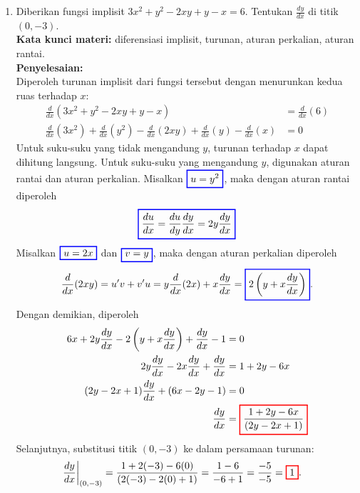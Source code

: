 \documentclass[10pt,openany,a4paper]{article}
\theoremstyle{definition}
\theoremstyle{definition}
\theoremstyle{plain}
\newenvironment{jawab}[2][tes]{
\textbf{Kata kunci materi:} #1.\\
\textbf{Penyelesaian:} #2
}{}
\begin{document}
\begin{enumerate}
    \item Diberikan fungsi implisit \(3x^2 + y^2 - 2xy + y - x = 6\). Tentukan \(\frac{dy}{dx}\) di titik \((0,-3)\).\\
    \begin{jawab}[diferensiasi implisit, turunan, aturan perkalian, aturan rantai]{~\\
        Diperoleh turunan implisit dari fungsi tersebut dengan menurunkan kedua ruas terhadap \(x\):
        \begin{align*}
            \frac{d}{dx}(3x^2 + y^2 - 2xy + y - x) &= \frac{d}{dx}(6)\\
            \frac{d}{dx}(3x^2) + \frac{d}{dx}(y^2) - \frac{d}{dx}(2xy) + \frac{d}{dx}(y) - \frac{d}{dx}(x) &= 0
        \end{align*}
        Untuk suku-suku yang tidak mengandung \(y\), turunan terhadap \(x\) dapat dihitung langsung. Untuk suku-suku yang mengandung \(y\), digunakan aturan rantai dan aturan perkalian. Misalkan $\colorlet{oldcolor}{.}
        \color{blue}
        \setlength{\fboxrule}{1pt} \boxed{\color{oldcolor}u=y^2}\color{oldcolor}$, maka dengan aturan rantai diperoleh
        \begin{align*}
            \colorlet{oldcolor}{.}
        \color{blue}
        \setlength{\fboxrule}{1pt} \boxed{\color{oldcolor}\frac{du}{dx} = \frac{du}{dy}\frac{dy}{dx} = 2y\frac{dy}{dx}}\color{oldcolor}
        \end{align*}
        Misalkan $\colorlet{oldcolor}{.}
        \color{blue}
        \setlength{\fboxrule}{1pt} \boxed{\color{oldcolor}u=2x}\color{oldcolor}$ dan $\colorlet{oldcolor}{.}
        \color{blue}
        \setlength{\fboxrule}{1pt}\boxed{\color{oldcolor}v=y}\color{oldcolor}$, maka dengan aturan perkalian diperoleh
        \begin{align*}
        \frac{d}{dx}(2xy)=u'v+v'u=y\frac{d}{dx}(2x) + x\frac{dy}{dx}= \colorlet{oldcolor}{.}
        \color{blue}
        \setlength{\fboxrule}{1pt} \boxed{\color{oldcolor}2\left(y + x\frac{dy}{dx}\right)}\color{oldcolor}.
        \end{align*}
        Dengan demikian, diperoleh
        \begin{align*}
            6x + 2y\frac{dy}{dx} - 2\left(y + x\frac{dy}{dx}\right) + \frac{dy}{dx} - 1 &= 0\\
            2y\frac{dy}{dx}  - 2x\frac{dy}{dx} + \frac{dy}{dx}  &= 1+2y-6x\\
            (2y - 2x + 1)\frac{dy}{dx} + (6x - 2y - 1) &= 0\\
            \frac{dy}{dx} &=
            \colorlet{oldcolor}{.}
        \color{red}
        \setlength{\fboxrule}{1pt} \boxed{\color{oldcolor}\frac{1+2y-6x}{(2y - 2x + 1)}}\color{oldcolor}
        \end{align*}
        Selanjutnya, substitusi titik \((0,-3)\) ke dalam persamaan turunan:
        \begin{align*}
            \frac{dy}{dx}\bigg|_{(0,-3)} &= \frac{1+2(-3)-6(0)}{(2(-3) - 2(0) + 1)}= \frac{1-6}{-6 + 1}= \frac{-5}{-5}= \colorlet{oldcolor}{.}
        \color{red}
        \setlength{\fboxrule}{1pt} \boxed{\color{oldcolor}1}\color{oldcolor}.
        \end{align*}
    }
        

\end{jawab}
\end{enumerate}
\end{document}
